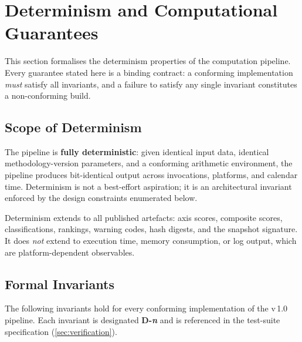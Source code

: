 \section{Determinism and Computational Guarantees}\label{sec:determinism}

This section formalises the determinism properties of the \ISI computation
pipeline.  Every guarantee stated here is a binding contract: a conforming
implementation \emph{must} satisfy all invariants, and a failure to satisfy
any single invariant constitutes a non-conforming build.

\subsection{Scope of Determinism}\label{sec:det:scope}

The \ISI pipeline is \textbf{fully deterministic}: given identical input data,
identical methodology-version parameters, and a conforming arithmetic
environment, the pipeline produces bit-identical output across invocations,
platforms, and calendar time.  Determinism is not a best-effort aspiration; it
is an architectural invariant enforced by the design constraints enumerated
below.

Determinism extends to all published artefacts: axis scores, composite scores,
classifications, rankings, warning codes, hash digests, and the snapshot
signature.  It does \emph{not} extend to execution time, memory consumption,
or log output, which are platform-dependent observables.

\subsection{Formal Invariants}\label{sec:det:invariants}

The following invariants hold for every conforming implementation of the
\ISI v\,1.0 pipeline.  Each invariant is designated \textbf{D-\textit{n}} and
is referenced in the test-suite specification (\cref{sec:verification}).

